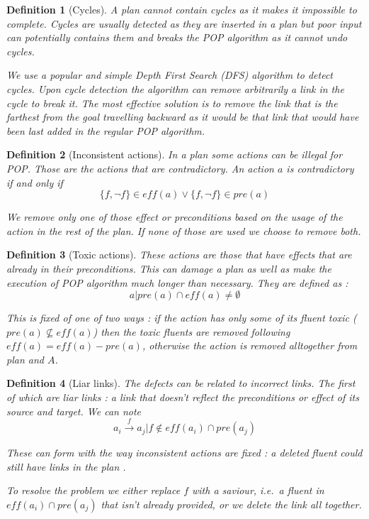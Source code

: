\documentclass[]{article}
\newtheorem{definition}{Definition}
\begin{document}
\begin{definition}[Cycles]

A plan cannot contain cycles as it makes it impossible to complete.
Cycles are usually detected as they are inserted in a plan but poor
input can potentially contains them and breaks the POP algorithm as it
cannot undo cycles.

We use a popular and simple Depth First Search (DFS) algorithm to detect
cycles. Upon cycle detection the algorithm can remove arbitrarily a link
in the cycle to break it. The most effective solution is to remove the
link that is the farthest from the goal travelling backward as it would
be that link that would have been last added in the regular POP
algorithm.

\end{definition}

\begin{definition}[Inconsistent actions]

In a plan some actions can be illegal for POP. Those are the actions
that are contradictory. An action \(a\) is contradictory if and only if
\[\{f, \lnot f \} \in eff(a) \lor \{f, \lnot f \} \in pre(a)\]

We remove only one of those effect or preconditions based on the usage
of the action in the rest of the plan. If none of those are used we
choose to remove both.

\end{definition}

\begin{definition}[Toxic actions]

These actions are those that have effects that are already in their
preconditions. This can damage a plan as well as make the execution of
POP algorithm much longer than necessary. They are defined as :
\[a | pre(a) \cap eff(a) \neq \emptyset\]

This is fixed of one of two ways : if the action has only some of its
fluent toxic (\(pre(a) \nsubseteq eff(a)\)) then the toxic fluents are
removed following \(eff(a) = eff(a)-pre(a)\), otherwise the action is
removed alltogether from plan and \(A\).

\end{definition}

\begin{definition}[Liar links]

The defects can be related to incorrect links. The first of which are
liar links : a link that doesn't reflect the preconditions or effect of
its source and target. We can note
\[a_i \xrightarrow{f} a_j | f \notin eff(a_i) \cap pre(a_j)\]

These can form with the way inconsistent actions are fixed : a deleted
fluent could still have links in the plan .

To resolve the problem we either replace \(f\) with a saviour, i.e.~a
fluent in \(eff(a_i) \cap pre(a_j)\) that isn't already provided, or we
delete the link all together.

\end{definition}
\end{document}
